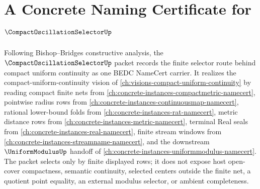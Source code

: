 \chapter{A Concrete Naming Certificate for $\CompactOscillationSelectorUp$}
\label{ch:concrete-instances-compact-oscillation-selector-namecert}

Following Bishop--Bridges constructive analysis, the $\CompactOscillationSelectorUp$ packet records the finite selector route behind compact uniform continuity as one BEDC NameCert carrier. It realizes the compact-uniform-continuity vision of \autoref{ch:visions-compact-uniform-continuity} by reading compact finite nets from \autoref{ch:concrete-instances-compactmetric-namecert}, pointwise radius rows from \autoref{ch:concrete-instances-continuousmap-namecert}, rational lower-bound folds from \autoref{ch:concrete-instances-rat-namecert}, metric distance rows from \autoref{ch:concrete-instances-metric-namecert}, terminal Real seals from \autoref{ch:concrete-instances-real-namecert}, finite stream windows from \autoref{ch:concrete-instances-streamname-namecert}, and the downstream $\UniformModulusUp$ handoff of \autoref{ch:concrete-instances-uniformmodulus-namecert}. The packet selects only by finite displayed rows; it does not expose host open-cover compactness, semantic continuity, selected centers outside the finite net, a quotient point equality, an external modulus selector, or ambient completeness.

